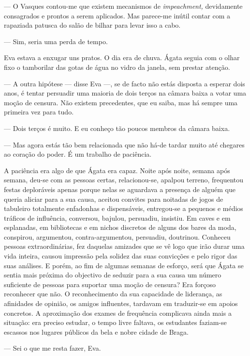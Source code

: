 --- O Vasques contou-me que existem mecanismos de \emph{impeachment,
  }devidamente consagrados e prontos a serem aplicados. Mas parece-me
  inútil contar com a rapaziada patusca do salão de bilhar para levar
  isso a cabo.


--- Sim, seria uma perda de tempo.


Eva estava a enxugar uns pratos. O dia era de chuva. Ágata seguia com
o olhar fixo o tamborilar das gotas de água no vidro da janela, sem
prestar atenção.

--- A outra hipótese --- disse Eva ---, se de facto não estás disposta a
  esperar dois anos, é tentar persuadir uma maioria de dois terços na
  câmara baixa a votar uma moção de censura. Não existem precedentes,
  que eu saiba, mas há sempre uma primeira vez para tudo.

--- Dois terços é muito. E eu conheço tão poucos membros da câmara
  baixa.

--- Mas agora estás tão bem relacionada que não há-de tardar muito até
  chegares ao coração do poder. É um trabalho de paciência.


A paciência era algo de que Ágata era capaz. Noite após noite, semana
após semana, deu-se com as pessoas certas, relacionou-se, apalpou
terreno, frequentou festas deploráveis apenas porque nelas se aguardava
a presença de alguém que queria aliciar para a sua causa, aceitou
convites para noitadas de jogos de tabuleiro totalmente enfadonhas e
dispensáveis, entregou-se a pequenos e médios tráficos de influência,
conversou, bajulou, persuadiu, insistiu. Em caves e em esplanadas, em
bibliotecas e em nichos discretos de alguns dos bares da moda,
conspirou, argumentou, contra-argumentou, persuadiu, doutrinou.
Conheceu pessoas extraordinárias, fez daquelas amizades que se vê logo
que irão durar uma vida inteira, causou impressão pela solidez das
suas convicções e pelo rigor das suas análises. E porém, ao fim de
algumas semanas de esforço, será que Ágata se sentia mais próxima do
objectivo de seduzir para a sua causa um número suficiente de pessoas
para suportar uma moção de censura? Era forçoso reconhecer
que não. O reconhecimento da sua capacidade de liderança, as afinidades
de opinião, os amigos influentes, tardavam em traduzir-se em apoios
concretos. A aproximação dos exames de frequência complicava ainda mais
a situação: era preciso estudar, o tempo livre faltava, os estudantes
faziam-se escassos nos lugares públicos da bela e nobre cidade de Braga.

--- Sei o que me resta fazer, Eva.

